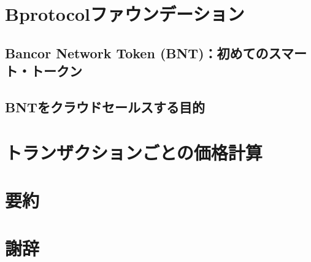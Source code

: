 \documentclass{jsarticle}
\begin{document}
\section{Bprotocolファウンデーション}



  \subsection{Bancor Network Token (BNT)：初めてのスマート・トークン}



  \subsection{BNTをクラウドセールスする目的}



\section{トランザクションごとの価格計算}



\section{要約}



\section{謝辞}
\end{document}
